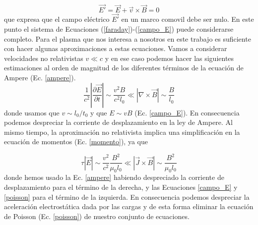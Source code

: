 \documentclass[a4paper,11pt]{report}
\begin{document}
\begin{equation}
\vec{E'} = \vec{E} + \vec{v} \times \vec{B} = 0 \label{campo_E}
\end{equation}
que expresa que el campo eléctrico $\vec{E'}$ en un marco comovil debe ser nulo.
En este punto el sistema de Ecuaciones (\ref{faraday})-(\ref{campo_E}) puede considerarse completo. Para el plasma que nos interesa a nosotros en este trabajo es suficiente con hacer algunas aproximaciones a estas ecuaciones. Vamos a considerar velocidades no relativistas $v\ll c$ y en ese caso podemos hacer las siguientes estimaciones al orden de magnitud de los diferentes términos de la ecuación de Ampere (Ec. \ref{ampere}).
\begin{equation}
\frac{1}{c^2} \left| \frac{\partial \vec{E}}{\partial t} \right| \sim \frac{v^2 B}{c^2 l_0} \ll \left| \nabla \times \vec{B} \right| \sim \frac{B}{l_0}
\end{equation}
donde usamos que $v\sim l_0/t_0$ y que $E\sim v B$ (Ec. \ref{campo_E}). En consecuencia podemos despreciar la corriente de desplazamiento en la ley de Ampere.
Al mismo tiempo, la aproximación no relativista implica una simplificación en la ecuación de momentos (Ec. \ref{momento}), ya que

\begin{equation}
\tau \left| \vec{E} \right| \sim \frac{v^2}{c^2} \frac{B^2}{\mu_0 l_0} \ll \left| \vec{J} \times \vec{B}\right| \sim \frac{B^2}{\mu_0 l_0}
\end{equation}
donde hemos usado la Ec. \ref{ampere} habiendo despreciado la corriente de desplazamiento para el término de la derecha, y las Ecuaciones \ref{campo_E} y \ref{poisson} para el término de la izquierda. En consecuencia podemos despreciar la aceleración electrostática dada por las cargas y de esta forma eliminar la ecuación de Poisson (Ec. \ref{poisson}) de nuestro conjunto de ecuaciones.
\end{document}
